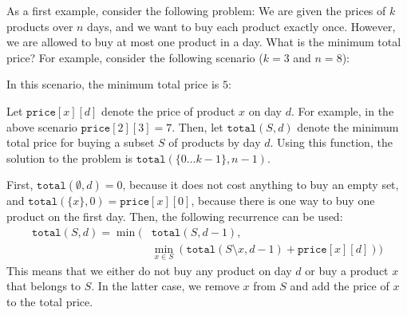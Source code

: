 As a first example, consider the following problem:
We are given the prices of $k$ products
over $n$ days, and we want to buy each product
exactly once.
However, we are allowed to buy at most one product
in a day.
What is the minimum total price?
For example, consider the following scenario ($k=3$ and $n=8$):
\begin{center}
\end{center}
In this scenario, the minimum total price is $5$:
\begin{center}
\end{center}

Let $\texttt{price}[x][d]$ denote the price of product $x$
on day $d$.
For example, in the above scenario $\texttt{price}[2][3] = 7$.
Then, let $\texttt{total}(S,d)$ denote the minimum total
price for buying a subset $S$ of products by day $d$.
Using this function, the solution to the problem is
$\texttt{total}(\{0 \ldots k-1\},n-1)$.

First, $\texttt{total}(\emptyset,d) = 0$,
because it does not cost anything to buy an empty set,
and $\texttt{total}(\{x\},0) = \texttt{price}[x][0]$,
because there is one way to buy one product on the first day.
Then, the following recurrence can be used:
\begin{equation*}
\begin{split}
\texttt{total}(S,d) = \min( & \texttt{total}(S,d-1), \\
& \min_{x \in S} (\texttt{total}(S \setminus x,d-1)+\texttt{price}[x][d]))
\end{split}
\end{equation*}
This means that we either do not buy any product on day $d$
or buy a product $x$ that belongs to $S$.
In the latter case, we remove $x$ from $S$ and add the
price of $x$ to the total price.

